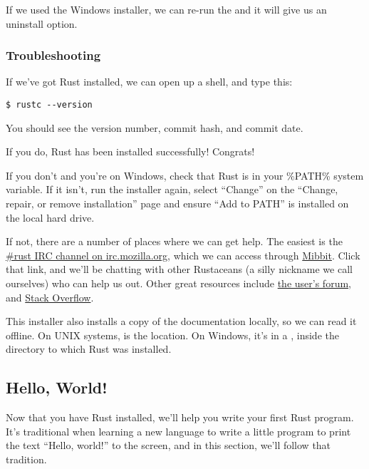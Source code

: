 If we used the Windows installer, we can re-run the  and it will give us an uninstall option.

\subsubsection*{Troubleshooting}

If we've got Rust installed, we can open up a shell, and type this:

\begin{verbatim}
$ rustc --version
\end{verbatim}

You should see the version number, commit hash, and commit date.

\blank

If you do, Rust has been installed successfully! Congrats!

\blank

If you don't and you're on Windows, check that Rust is in your \%PATH\% system variable. If it isn't, run the installer again, 
select \enquote{Change} on the \enquote{Change, repair, or remove installation} page and ensure \enquote{Add to PATH} is installed 
on the local hard drive.

\blank

If not, there are a number of places where we can get help. The easiest is the 
\href{irc://irc.mozilla.org/\#rust}{\#rust IRC channel on irc.mozilla.org}, which we can access through
\href{http://chat.mibbit.com/?server=irc.mozilla.org&channel=\%23rust}{Mibbit}. Click that link, and we'll be chatting with other 
Rustaceans (a silly nickname we call ourselves) who can help us out. Other great resources include 
\href{https://users.rust-lang.org/}{the user’s forum}, and \href{http://stackoverflow.com/questions/tagged/rust}{Stack Overflow}.

\blank

This installer also installs a copy of the documentation locally, so we can read it offline. On UNIX systems,  
is the location. On Windows, it's in a , inside the directory to which Rust was installed.

\subsection{Hello, World!}

Now that you have Rust installed, we'll help you write your first Rust program. It's traditional when learning a new language 
to write a little program to print the text \enquote{Hello, world!} to the screen, and in this section, we'll follow that 
tradition.

